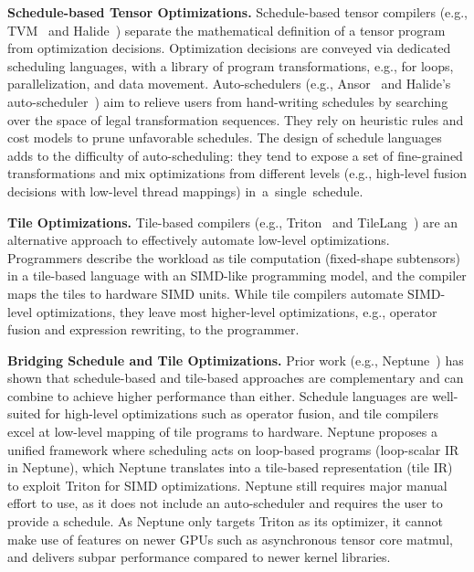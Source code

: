 \textbf{Schedule-based Tensor Optimizations.}
Schedule-based tensor compilers (e.g., TVM~\cite{tvm} and Halide~\cite{halide})
separate the mathematical definition of a tensor program from \mbox{optimization} decisions.
Optimization decisions are conveyed via dedicated scheduling languages,
with a library of program transformations, e.g., for loops,
parallelization, and data movement.
%
Auto-schedulers (e.g., Ansor~\cite{ansor} and Halide's auto-sche\-duler~\cite{halide-autosched})
aim to relieve users from hand-writing schedules by searching over the space of
legal transformation sequences.
They rely on heuristic rules and cost models to prune unfavorable schedules.
The design of schedule languages adds to the difficulty of auto-scheduling:
they tend to expose a set of fine-grained transformations
and mix optimizations from different levels (e.g., high-level fusion decisions with
low-level thread mappings) \mbox{in a single schedule.}

\textbf{Tile Optimizations.}
Tile-based compilers (e.g., Triton~\cite{triton} and TileLang~\cite{tilelang})
are an alternative approach to effectively automate low-level optimizations.
Programmers describe the workload as tile computation (fixed-shape subtensors)
in a tile-based language with an SIMD-like programming model,
and the compiler maps the tiles to hardware SIMD units.
While tile compilers automate SIMD-level optimizations,
they leave most higher-level optimizations, e.g., operator fusion and expression rewriting,
to the programmer.

\textbf{Bridging Schedule and Tile Optimizations.}
Prior work (e.g., Neptune~\cite{neptune}) has shown that schedule-based and tile-based
approaches are complementary and can combine to achieve higher performance than either.
Schedule languages are well-suited for high-level optimizations such as operator fusion,
and tile compilers excel at low-level mapping of tile programs to hardware.
Neptune proposes a unified framework where scheduling acts on loop-based programs
(loop-scalar IR in Neptune), which Neptune translates into a tile-based representation (tile IR)
to exploit Triton for SIMD optimizations.
Neptune still requires major manual effort to use, as it does not include an auto-scheduler
and requires the user to provide a schedule.
As Neptune only targets Triton as its optimizer, it cannot make use of
features on newer GPUs such as asynchronous tensor core matmul,
and delivers subpar performance compared to newer kernel libraries.

